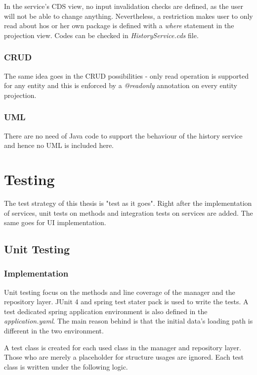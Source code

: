 \bigskip
In the service's CDS view, no input invalidation checks are defined, as the user will not be able to change anything. Nevertheless, a restriction makes user to only read about hos or her own package is defined with a \textit{where} statement in the projection view. Codes can be checked in \textit{HistoryService.cds} file.

\subsubsection{CRUD}
The same idea goes in the CRUD possibilities - only read operation is supported for any entity and this is enforced by a \textit{@readonly} annotation on every entity projection.

\subsubsection{UML}

There are no need of Java code to support the behaviour of the history service and hence no UML is included here.


\section{Testing}
The test strategy of this thesis is "test as it goes". Right after the implementation of services, unit tests on methods and integration tests on services are added. The same goes for UI implementation.

\subsection{Unit Testing}

\subsubsection{Implementation}
Unit testing focus on the methods and line coverage of the manager and the repository layer. JUnit 4 and spring test stater pack is used to write the tests. A test dedicated spring application environment is also defined in the \textit{application.yaml}. The main reason behind is that the initial data's loading path is different in the two environment.

\bigskip
A test class is created for each used class in the manager and repository layer. Those who are merely a placeholder for structure usages are ignored. Each test class is written under the following logic.

